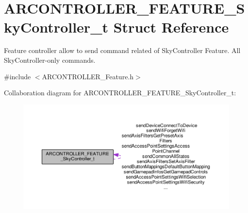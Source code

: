 \hypertarget{struct_a_r_c_o_n_t_r_o_l_l_e_r___f_e_a_t_u_r_e___sky_controller__t}{}\section{A\+R\+C\+O\+N\+T\+R\+O\+L\+L\+E\+R\+\_\+\+F\+E\+A\+T\+U\+R\+E\+\_\+\+Sky\+Controller\+\_\+t Struct Reference}
\label{struct_a_r_c_o_n_t_r_o_l_l_e_r___f_e_a_t_u_r_e___sky_controller__t}


Feature controller allow to send command related of Sky\+Controller Feature. All Sky\+Controller-\/only commands.  




{\ttfamily \#include $<$A\+R\+C\+O\+N\+T\+R\+O\+L\+L\+E\+R\+\_\+\+Feature.\+h$>$}



Collaboration diagram for A\+R\+C\+O\+N\+T\+R\+O\+L\+L\+E\+R\+\_\+\+F\+E\+A\+T\+U\+R\+E\+\_\+\+Sky\+Controller\+\_\+t\+:
\nopagebreak
\begin{figure}[H]
\begin{center}
\leavevmode
\includegraphics[width=350pt]{struct_a_r_c_o_n_t_r_o_l_l_e_r___f_e_a_t_u_r_e___sky_controller__t__coll__graph}
\end{center}
\end{figure}
